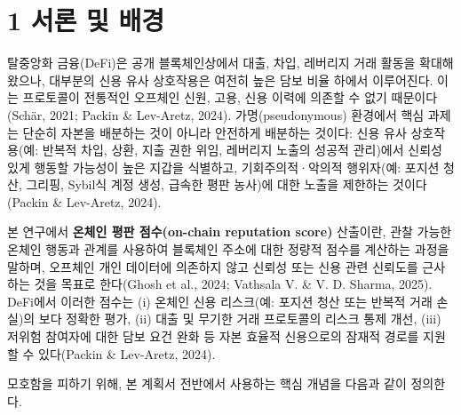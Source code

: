 \clearpage
{}
\section*{1 \textbf{서론 및 배경}}
\label{sec:introduction-and-background}

탈중앙화 금융(DeFi)은 공개 블록체인상에서 대출, 차입, 레버리지 거래 활동을 확대해 왔으나, 대부분의 신용 유사 상호작용은 여전히 높은 담보 비율 하에서 이루어진다. 이는 프로토콜이 전통적인 오프체인 신원, 고용, 신용 이력에 의존할 수 없기 때문이다(Sch\"{a}r, 2021; Packin \& Lev-Aretz, 2024). 가명(pseudonymous) 환경에서 핵심 과제는 단순히 자본을 배분하는 것이 아니라 안전하게 배분하는 것이다: 신용 유사 상호작용(예: 반복적 차입, 상환, 지출 권한 위임, 레버리지 노출의 성공적 관리)에서 신뢰성 있게 행동할 가능성이 높은 지갑을 식별하고, 기회주의적·악의적 행위자(예: 포지션 청산, 그리핑, Sybil식 계정 생성, 급속한 평판 농사)에 대한 노출을 제한하는 것이다(Packin \& Lev-Aretz, 2024).


본 연구에서 \textbf{온체인 평판 점수(on-chain reputation score)} 산출이란, 관찰 가능한 온체인 행동과 관계를 사용하여 블록체인 주소에 대한 정량적 점수를 계산하는 과정을 말하며, 오프체인 개인 데이터에 의존하지 않고 신뢰성 또는 신용 관련 신뢰도를 근사하는 것을 목표로 한다(Ghosh et al., 2024; Vathsala V. \& V. D. Sharma, 2025). DeFi에서 이러한 점수는 (i) 온체인 신용 리스크(예: 포지션 청산 또는 반복적 거래 손실)의 보다 정확한 평가, (ii) 대출 및 무기한 거래 프로토콜의 리스크 통제 개선, (iii) 저위험 참여자에 대한 담보 요건 완화 등 자본 효율적 신용으로의 잠재적 경로를 지원할 수 있다(Packin \& Lev-Aretz, 2024).


모호함을 피하기 위해, 본 계획서 전반에서 사용하는 핵심 개념을 다음과 같이 정의한다.


